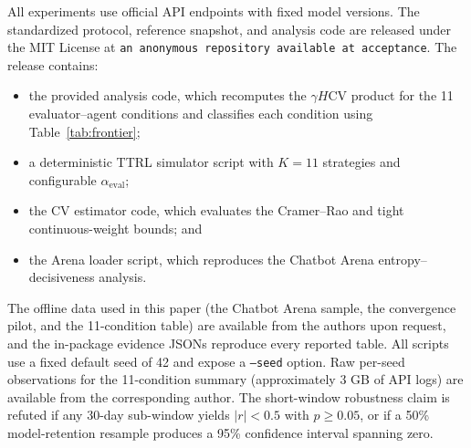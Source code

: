 \documentclass[11pt]{article}
\begin{document}
All experiments use official API endpoints with fixed model versions. The standardized protocol, reference snapshot, and analysis code are released under the MIT License at \texttt{an anonymous repository available at acceptance}. The release contains:
\begin{itemize}[leftmargin=*,nosep]
  \item the provided analysis code, which recomputes the $\gamma H\mathrm{CV}$ product for the 11 evaluator--agent conditions and classifies each condition using Table~\ref{tab:frontier};
  \item a deterministic TTRL simulator script with $K{=}11$ strategies and configurable $\alpha_{\text{eval}}$;
  \item the CV estimator code, which evaluates the Cramer--Rao and tight continuous-weight bounds; and
  \item the Arena loader script, which reproduces the Chatbot Arena entropy--decisiveness analysis.
\end{itemize}
The offline data used in this paper (the Chatbot Arena sample, the convergence pilot, and the 11-condition table) are available from the authors upon request, and the in-package evidence JSONs reproduce every reported table. All scripts use a fixed default seed of 42 and expose a \texttt{--seed} option. Raw per-seed observations for the 11-condition summary (approximately 3 GB of API logs) are available from the corresponding author. The short-window robustness claim is refuted if any 30-day sub-window yields $|r| < 0.5$ with $p \geq 0.05$, or if a 50\% model-retention resample produces a 95\% confidence interval spanning zero.
\end{document}
